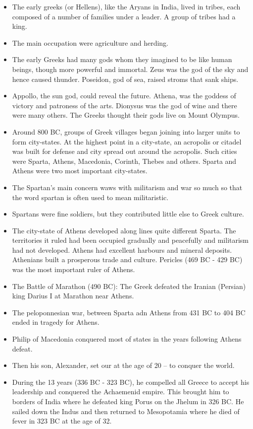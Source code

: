 \documentclass[
  openany]{book}
\providecommand{\tightlist}{%
  \setlength{\itemsep}{0pt}\setlength{\parskip}{0pt}}
\begin{document}
\begin{itemize}
\tightlist
\item
  The early greeks (or Hellens), like the Aryans in India, lived in tribes, each composed of a number of families under a leader. A group of tribes had a king.
\item
  The main occupation were agriculture and herding.
\item
  The early Greeks had many gods whom they imagined to be like human beings, though more powerful and immortal. Zeus was the god of the sky and hence caused thunder. Poseidon, god of sea, raised stroms that sank ships.
\item
  Appollo, the sun god, could reveal the future. Athena, was the goddess of victory and patroness of the arts. Dionysus was the god of wine and there were many others. The Greeks thought their gods live on Mount Olympus.
\item
  Around 800 BC, groups of Greek villages began joining into larger units to form city-states. At the highest point in a city-state, an acropolis or citadel was built for defense and city spread out around the acropolis. Such cities were Sparta, Athens, Macedonia, Corinth, Thebes and others. Sparta and Athens were two most important city-states.
\item
  The Spartan's main concern waws with militarism and war so much so that the word spartan is often used to mean militaristic.
\item
  Spartans were fine soldiers, but they contributed little else to Greek culture.
\item
  The city-state of Athens developed along lines quite different Sparta. The territories it ruled had been occupied gradually and peacefully and militarism had not developed. Athens had excellent harbours and mineral deposits. Athenians built a prosperous trade and culture. Pericles (469 BC - 429 BC) was the most important ruler of Athens.
\item
  The Battle of Marathon (490 BC): The Greek defeated the Iranian (Persian) king Darius I at Marathon near Athens.
\item
  The peloponnesian war, between Sparta adn Athens from 431 BC to 404 BC ended in tragedy for Athens.
\item
  Philip of Macedonia conquered most of states in the years following Athens defeat.
\item
  Then his son, Alexander, set our at the age of 20 -- to conquer the world.
\item
  During the 13 years (336 BC - 323 BC), he compelled all Greece to accept his leadership and conquered the Achaemenid empire. This brought him to borders of India where he defeated king Porus on the Jhelum in 326 BC. He sailed down the Indus and then returned to Mesopotamia where he died of fever in 323 BC at the age of 32.

\end{itemize}
\end{document}
